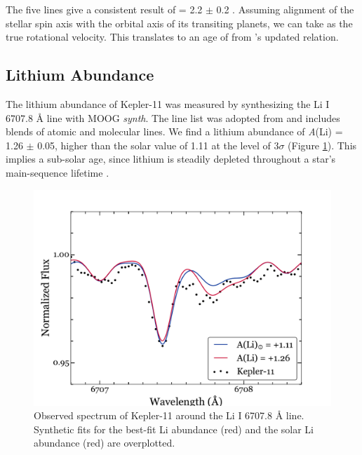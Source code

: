 \documentclass[oneside]{emulateapj}
\begin{document}
The five lines give a consistent result of \vsini = 2.2 $\pm$ 0.2 \kms. Assuming alignment of the stellar spin axis with the orbital axis of its transiting planets, we can take \vsini as the true rotational velocity. This translates to an age of  from \citet{dosSantos2016}'s updated relation.

\subsection{Lithium Abundance}
\label{s:lithium}

The lithium abundance of Kepler-11 was measured by synthesizing the Li I 6707.8 \r{A} line with MOOG \textit{synth}. The line list was adopted from \citet{Melendez2012} and includes blends of atomic and molecular lines. We find a lithium abundance of \textit{A}(Li) = 1.26 $\pm$ 0.05, higher than the solar value of 1.11 at the level of 3$\sigma$ (Figure \ref{fig:lithium}). This implies a sub-solar age, since lithium is steadily depleted throughout a star's main-sequence lifetime .

\begin{figure}
\centering
\includegraphics[width=\columnwidth]{lithium}
\caption{Observed spectrum of Kepler-11 around the Li I 6707.8 \r{A} line. Synthetic fits for the best-fit Li abundance (red) and the solar Li abundance (red) are overplotted. }
\label{fig:lithium}
\end{figure}
\end{document}
